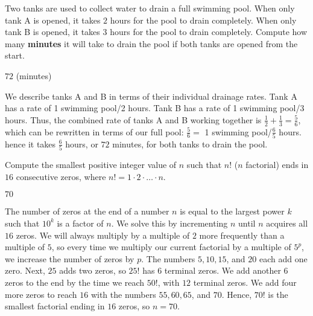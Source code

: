 \documentclass[11pt]{article}
\begin{document}
\begin{problem}%
Two tanks are used to collect water to drain a full swimming pool. When only tank A is opened, it takes $2$ hours for the pool to drain completely. When only tank B is opened, it takes $3$ hours for the pool to drain completely. Compute how many \textbf{minutes} it will take to drain the pool if both tanks are opened from the start.
\end{problem}

\begin{answer}
$\boxed{72}$ (minutes)
\end{answer}

\begin{solution}
We describe tanks A and B in terms of their individual drainage rates. Tank A has a rate of 1 swimming pool/2 hours. Tank B has a rate of 1 swimming pool/3 hours. Thus, the combined rate of tanks A and B working together is $\frac{1}{2} + \frac{1}{3} = \frac{5}{6}$, which can be rewritten in terms of our full pool: $\frac{5}{6} =$ 1 swimming pool/$\frac{6}{5}$ hours. hence it takes $\frac{6}{5}$ hours, or $\boxed{72}$ minutes, for both tanks to drain the pool.
\end{solution}


\begin{problem}%
Compute the smallest positive integer value of $n$ such that $n!$ ($n$ factorial) ends in $16$ consecutive zeros, where $n! = 1 \cdot 2 \cdot \ldots \cdot n$.
\end{problem}

\begin{answer}
$\boxed{70}$
\end{answer}

\begin{solution}
The number of zeros at the end of a number $n$ is equal to the largest power $k$ such that $10^k$ is a factor of $n$. We solve this by incrementing $n$ until $n$ acquires all $16$ zeros. We will always multiply by a multiple of $2$ more frequently than a multiple of $5$, so every time we multiply our current factorial by a multiple of $5^p$, we increase the number of zeros by $p$. The numbers $5, 10, 15$, and $20$ each add one zero. Next, $25$ adds two zeros, so $25!$ has 6 terminal zeros. We add another $6$ zeros to the end by the time we reach $50!$, with $12$ terminal zeros. We add four more zeros to reach $16$ with the numbers $55, 60, 65$, and $70$. Hence, $70!$ is the smallest factorial ending in $16$ zeros, so $n = \boxed{70}$.
\end{solution}
\end{document}
